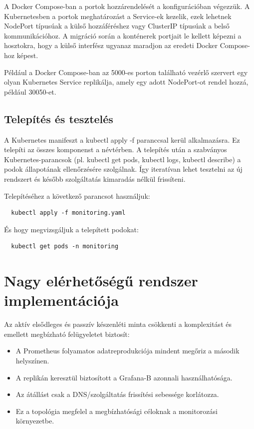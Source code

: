 A Docker Compose-ban a portok hozzárendelését a konfigurációban végezzük. 
A Kubernetesben a portok meghatározást a Service-ek kezelik, ezek lehetnek 
NodePort típusúak a külső hozzáféréshez vagy ClusterIP típusúak a belső kommunikációhoz. 
A migráció során a konténerek portjait le kellett képezni a hosztokra, hogy a külső interfész 
ugyanaz maradjon az eredeti Docker Compose-hoz képest.

Például a Docker Compose-ban az 5000-es porton található vezérlő szervert egy olyan Kubernetes Service replikálja, 
amely egy adott NodePort-ot rendel hozzá, például 30050-et.

\subsection{Telepítés és tesztelés}

A Kubernetes manifeszt a kubectl apply -f paranccsal kerül alkalmazásra. Ez telepíti az összes komponenst a névtérben. 
A telepítés után a szabványos Kubernetes-parancsok (pl. kubectl get pods, kubectl logs, kubectl describe) 
a podok állapotának ellenőrzésére szolgálnak. Így iteratívan lehet tesztelni az új rendszert és később 
szolgáltatás kimaradás nélkül frissíteni.

Telepítéséhez a következő parancsot használjuk:

\begin{lstlisting}
  kubectl apply -f monitoring.yaml
\end{lstlisting}

És hogy megvizsgáljuk a telepített podokat:

\begin{lstlisting}
  kubectl get pods -n monitoring
\end{lstlisting}

\section{Nagy elérhetőségű rendszer implementációja}

Az aktív elsődleges és passzív készenléti minta csökkenti a komplexitást és 
emellett megbízható felügyeletet biztosít:

\begin{itemize}
  \item A Prometheus folyamatos adatreprodukciója mindent megőriz a második helyszínen.
  
  \item A replikán keresztül biztosított a Grafana-B azonnali használhatósága.
  
  \item Az átállást csak a DNS/szolgáltatás frissítési sebessége korlátozza.
  
  \item Ez a topológia megfelel a megbízhatósági céloknak a monitorozási környezetbe.
  
\end{itemize}

